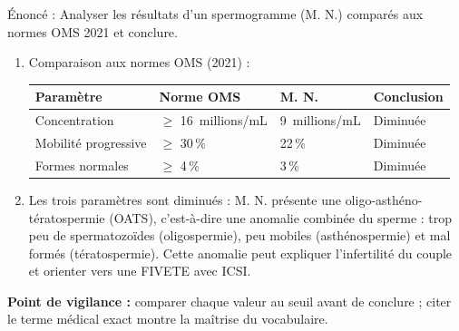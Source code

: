 \documentclass[11pt]{article}
\newcommand{\cle}[1]{{\popxbold\color{popdark}#1}}
\begin{document}
\begin{corrige}
Énoncé : Analyser les résultats d'un spermogramme (M. N.) comparés aux normes OMS 2021 et conclure.
\tcblower
\begin{enumerate}
\item Comparaison aux normes OMS (2021) :
\begin{center}
\begin{tabularx}{\linewidth}{|l|X|X|X|}
\hline
\rowcolor{popblueL} \textbf{Paramètre} & \textbf{Norme OMS} & \textbf{M. N.} & \textbf{Conclusion} \\
\hline
Concentration & $\ge$ 16~millions/mL & 9~millions/mL & Diminuée \\
\hline
Mobilité progressive & $\ge$ 30\,\% & 22\,\% & Diminuée \\
\hline
Formes normales & $\ge$ 4\,\% & 3\,\% & Diminuée \\
\hline
\end{tabularx}
\end{center}
\item Les trois paramètres sont diminués : M. N. présente une \cle{oligo-asthéno-tératospermie} (OATS), c'est-à-dire une anomalie combinée du sperme : trop peu de spermatozoïdes (oligospermie), peu mobiles (asthénospermie) et mal formés (tératospermie). Cette anomalie peut expliquer l'infertilité du couple et orienter vers une FIVETE avec ICSI.
\end{enumerate}
\textbf{Point de vigilance :} comparer chaque valeur au seuil avant de conclure ; citer le terme médical exact montre la maîtrise du vocabulaire.
\end{corrige}
\end{document}
